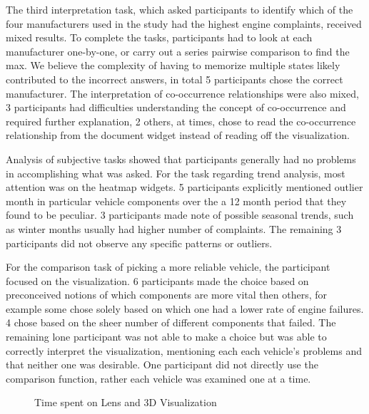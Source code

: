 The third interpretation task, which asked participants to identify which of the four
manufacturers used in the study had the highest engine complaints, received
mixed results. To complete the tasks, participants had to look at each
manufacturer one-by-one, or carry out a series pairwise comparison to find the
max. We believe the complexity of having to memorize multiple states likely
contributed to the incorrect answers, in total 5 participants chose the correct
manufacturer. The interpretation of co-occurrence relationships were also mixed,
3 participants had difficulties understanding the concept of co-occurrence and
required further explanation, 2 others, at times, chose to read the
co-occurrence relationship from the document widget instead of reading off the
visualization.

Analysis of subjective tasks showed that participants generally had no problems
in accomplishing what was asked. For the task regarding trend analysis, most
attention was on the heatmap widgets. 5 participants explicitly mentioned
outlier month in particular vehicle components over the a 12 month period that
they found to be peculiar. 3 participants made note of possible seasonal trends,
such as winter months usually had higher number of complaints. The remaining 3
participants did not observe any specific patterns or outliers. 

For the comparison task of picking a more reliable vehicle, the participant
focused on the \threed visualization. 6 participants made the choice based on
preconceived notions of which components are more vital then others, for example
some chose solely based on which one had a lower rate of engine failures. 4
chose based on the sheer number of different components that failed. The
remaining lone participant was not able to make a choice but was able to
correctly interpret the visualization, mentioning each each vehicle's problems
and that neither one was desirable. One participant did not directly use the
comparison function, rather each vehicle was examined one at a time.

 

\begin{figure}
\caption{Time spent on Lens and 3D Visualization}
\label{chart:usage}     
\end{figure}
  
